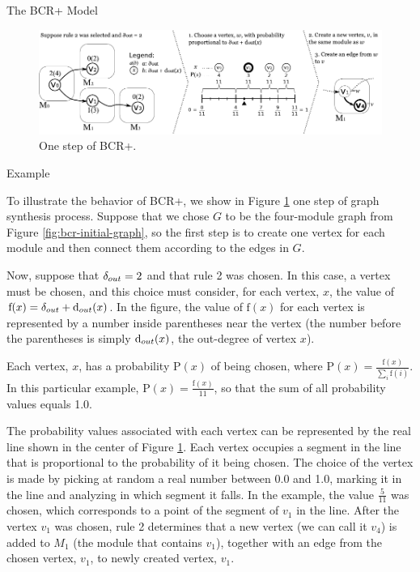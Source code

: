 \documentclass[11pt,twocolumn,a4paper,english]{article}
\begin{document}
\begin{section}{The BCR+ Model}
\begin{figure}[htbp]
	\centering
		\includegraphics[width=\textwidth]{figures/bcr-example}
	\caption{One step of BCR+.}
	\label{fig:bcr-example}
\end{figure}

\begin{subsection}{Example} \label{sec:example}
	
	To illustrate the behavior of BCR+, we show in Figure \ref{fig:bcr-example} one step of graph synthesis process. Suppose that we chose $G$ to be the four-module graph from Figure \ref{fig:bcr-initial-graph}, so the first step is to create one vertex for each module and then connect them according to the edges in $G$. 
	
	Now, suppose that $\delta_{out} = 2$ and that rule 2 was chosen. In this case, a vertex must be chosen, and this choice must consider, for each vertex, $x$, the value of $\mathrm{f}(x) = \delta_{out} + \mathrm{d}_{out}(x)$. In the figure, the value of $\mathrm{f}(x)$ for each vertex is represented by a number inside parentheses near the vertex (the number before the parentheses is simply $\mathrm{d}_{out}(x)$, the out-degree of vertex $x$).
	
	Each vertex, $x$, has a probability $\mathrm{P}(x)$ of being chosen, where $\mathrm{P}(x) = \frac{\mathrm{f}(x)}{\sum_i \mathrm{f}(i)}$. In this particular example, $\mathrm{P}(x) = \frac{\mathrm{f}(x)}{11}$, so that the sum of all probability values equals 1.0.
	
	The probability values associated with each vertex can be represented by the real line shown in the center of Figure \ref{fig:bcr-example}. Each vertex occupies a segment in the line that is proportional to the probability of it being chosen. The choice of the vertex is made by picking at random a real number between 0.0 and 1.0, marking it in the line and analyzing in which segment it falls. In the example, the value $\frac{5}{11}$ was chosen, which corresponds to a point of the segment of $v_1$ in the line. After the vertex $v_1$ was chosen, rule 2 determines that a new vertex (we can call it $v_4$) is added to $M_1$ (the module that contains $v_1$), together with an edge from the chosen vertex, $v_1$, to newly created vertex, $v_1$.
	

\end{subsection}
\end{section}
\end{document}
